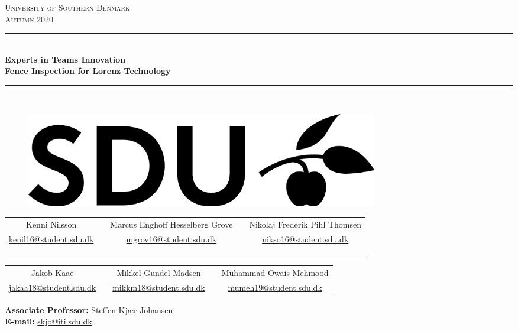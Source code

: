 \documentclass[main.tex]{subfiles}
\begin{document}
\begin{titlepage}
\begin{center}
\textsc{\LARGE University of Southern Denmark}\\[1.5cm]


\textsc{\large  Autumn 2020}\\[0.5cm]
\rule{\linewidth}{0.5mm}\\[0.2cm]
{ \LARGE \bfseries Experts in Teams Innovation \\[0.4cm]}
{ \Large \bfseries Fence Inspection for Lorenz Technology \\ [0.2cm]}
\rule{\linewidth}{0.5mm}\\[1.2cm]

\vspace{0.25cm}

    \begin{figure}[h!]
    \centering
    \includegraphics[width=0.75\textwidth]{Figures/SDUlogo.png}
    \label{fig:SDUlogo}\\
    [1.5cm]
    \end{figure}


\begin{tabular}{c c c c c}
	\cline{1-1}\cline{3-3}\cline{5-5}
	\\
    Kenni Nilsson & & Marcus Enghoff Hesselberg Grove & & Nikolaj Frederik Pihl Thomsen\\
    \href{mailto:kenil16@student.sdu.dk}{kenil16@student.sdu.dk} & & \href{mailto:mgrov16@student.sdu.dk}{mgrov16@student.sdu.dk} & &
    \href{mailto:nikso16@student.sdu.dk} {nikso16@student.sdu.dk}\\ \\ \\ \\
\end{tabular}	
\begin{tabular}{c c c c c}
	\cline{1-1}\cline{3-3}\cline{5-5}
	\\
    Jakob Kaae & & Mikkel Gundel Madsen & & Muhammad Owais Mehmood\\
    \href{mailto:jakaa18@student.sdu.dk}{jakaa18@student.sdu.dk} & & \href{mailto:mikkm18@student.sdu.dk}{mikkm18@student.sdu.dk} & &
    \href{mailto:mumeh19@student.sdu.dk} {mumeh19@student.sdu.dk}
\end{tabular}	

\vfill

\textbf{Associate Professor:} Steffen Kjær Johansen\\
\textbf{E-mail:} \href{mailto:skjo@iti.sdu.dk}{skjo@iti.sdu.dk} \\ 
\mbox{}\\
\end{center}
\end{titlepage}
\end{document}
